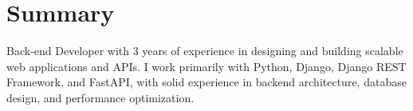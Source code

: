 
\section*{Summary}

Back-end Developer with 3 years of experience in designing and building scalable web applications and APIs. I work primarily with Python, Django, Django REST Framework, and FastAPI, with solid experience in backend architecture, database design, and performance optimization.

